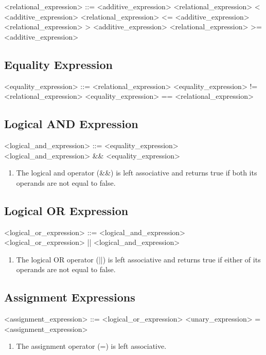 \begin{grammar}
<relational_expression> ::= <additive_expression>
\alt <relational_expression> < <additive_expression>
\alt <relational_expression> <= <additive_expression>
\alt <relational_expression> > <additive_expression>
\alt <relational_expression> >= <additive_expression>
\end{grammar}


\subsection{Equality Expression}
\begin{grammar}
	<equality_expression> ::= <relational_expression>
		\alt <equality_expression> != <relational_expression>
		\alt <equality_expression> == <relational_expression>
\end{grammar}

\subsection{Logical AND Expression}
\begin{grammar}
	<logical_and_expression> ::= <equality_expression>
		\alt <logical_and_expression> \&\& <equality_expression>
\end{grammar}
\begin{enumerate}
	\item The logical and operator (\&\&) is left associative and returns true if both its operands are not equal to false.
\end{enumerate}

\subsection{Logical OR Expression}
\begin{grammar}
	<logical_or_expression> ::= <logical_and_expression>
		\alt <logical_or_expression> || <logical_and_expression>
\end{grammar}
\begin{enumerate}
	\item The logical OR operator (||) is left associative and returns true if either of its operands are not equal to false.
\end{enumerate}

\subsection{Assignment Expressions}
\begin{grammar}
	<assignment_expression> ::= <logical_or_expression>
		\alt <unary_expression> = <assignment_expression>
\end{grammar}
\begin{enumerate}
	\item The assignment operator (=) is left associative.
\end{enumerate}


